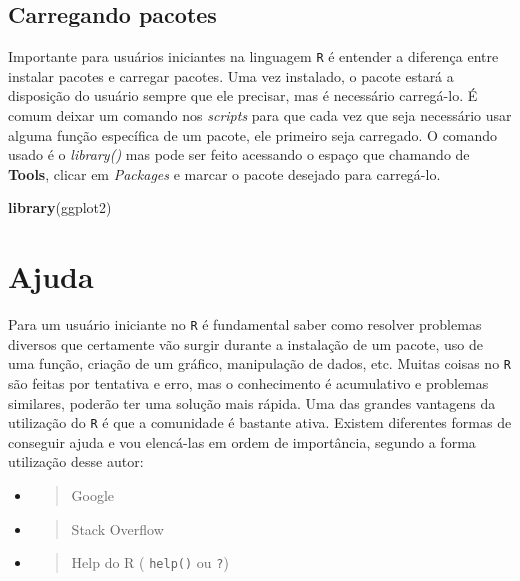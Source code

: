 \documentclass[
]{book}
\newenvironment{Shaded}{\begin{snugshade}}{\end{snugshade}}
\newcommand{\KeywordTok}[1]{\textcolor[rgb]{0.13,0.29,0.53}{\textbf{#1}}}
\newcommand{\NormalTok}[1]{#1}
\theoremstyle{definition}
\theoremstyle{definition}
\theoremstyle{definition}
\theoremstyle{remark}
\begin{document}
\hypertarget{carregando-pacotes}{%
\subsection{Carregando pacotes}\label{carregando-pacotes}}

Importante para usuários iniciantes na linguagem \texttt{R} é entender a diferença entre instalar pacotes e carregar pacotes. Uma vez instalado, o pacote estará a disposição do usuário sempre que ele precisar, mas é necessário carregá-lo. É comum deixar um comando nos \emph{scripts} para que cada vez que seja necessário usar alguma função específica de um pacote, ele primeiro seja carregado. O comando usado é o \emph{library()} mas pode ser feito acessando o espaço que chamando de \textbf{Tools}, clicar em \emph{Packages} e marcar o pacote desejado para carregá-lo.

\begin{Shaded}
\begin{Highlighting}[]
\KeywordTok{library}\NormalTok{(ggplot2)}
\end{Highlighting}
\end{Shaded}

\hypertarget{ajuda}{%
\section{Ajuda}\label{ajuda}}

Para um usuário iniciante no \texttt{R} é fundamental saber como resolver problemas diversos que certamente vão surgir durante a instalação de um pacote, uso de uma função, criação de um gráfico, manipulação de dados, etc. Muitas coisas no \texttt{R} são feitas por tentativa e erro, mas o conhecimento é acumulativo e problemas similares, poderão ter uma solução mais rápida. Uma das grandes vantagens da utilização do \texttt{R} é que a comunidade é bastante ativa. Existem diferentes formas de conseguir ajuda e vou elencá-las em ordem de importância, segundo a forma utilização desse autor:

\begin{itemize}
\item
  \begin{quote}
  Google
  \end{quote}
\item
  \begin{quote}
  Stack Overflow
  \end{quote}
\item
  \begin{quote}
  Help do R ( \texttt{help()} ou \texttt{?})
  \end{quote}
\end{itemize}
\end{document}
